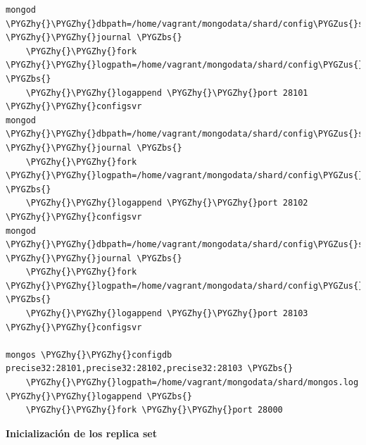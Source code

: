 \documentclass[a4paper,10pt,english]{sphinxmanual}
\def\PYGZbs{\char`\\}
\def\PYGZus{\char`\_}
\def\PYGZhy{\char`\-}
\begin{document}
\begin{Verbatim}[commandchars=\\\{\}]
mongod \PYGZhy{}\PYGZhy{}dbpath=/home/vagrant/mongodata/shard/config\PYGZus{}server\PYGZus{}1 \PYGZhy{}\PYGZhy{}journal \PYGZbs{}
    \PYGZhy{}\PYGZhy{}fork \PYGZhy{}\PYGZhy{}logpath=/home/vagrant/mongodata/shard/config\PYGZus{}server\PYGZus{}1/mongod.log \PYGZbs{}
    \PYGZhy{}\PYGZhy{}logappend \PYGZhy{}\PYGZhy{}port 28101 \PYGZhy{}\PYGZhy{}configsvr
mongod \PYGZhy{}\PYGZhy{}dbpath=/home/vagrant/mongodata/shard/config\PYGZus{}server\PYGZus{}2 \PYGZhy{}\PYGZhy{}journal \PYGZbs{}
    \PYGZhy{}\PYGZhy{}fork \PYGZhy{}\PYGZhy{}logpath=/home/vagrant/mongodata/shard/config\PYGZus{}server\PYGZus{}2/mongod.log \PYGZbs{}
    \PYGZhy{}\PYGZhy{}logappend \PYGZhy{}\PYGZhy{}port 28102 \PYGZhy{}\PYGZhy{}configsvr
mongod \PYGZhy{}\PYGZhy{}dbpath=/home/vagrant/mongodata/shard/config\PYGZus{}server\PYGZus{}3 \PYGZhy{}\PYGZhy{}journal \PYGZbs{}
    \PYGZhy{}\PYGZhy{}fork \PYGZhy{}\PYGZhy{}logpath=/home/vagrant/mongodata/shard/config\PYGZus{}server\PYGZus{}3/mongod.log \PYGZbs{}
    \PYGZhy{}\PYGZhy{}logappend \PYGZhy{}\PYGZhy{}port 28103 \PYGZhy{}\PYGZhy{}configsvr

mongos \PYGZhy{}\PYGZhy{}configdb precise32:28101,precise32:28102,precise32:28103 \PYGZbs{}
    \PYGZhy{}\PYGZhy{}logpath=/home/vagrant/mongodata/shard/mongos.log \PYGZhy{}\PYGZhy{}logappend \PYGZbs{}
    \PYGZhy{}\PYGZhy{}fork \PYGZhy{}\PYGZhy{}port 28000
\end{Verbatim}

\textbf{Inicialización de los replica set}
\end{document}
